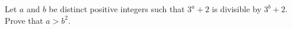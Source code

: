 \begin{problem}
    Let \( a \) and \( b \) be distinct positive integers such that \( 3^a + 2 \) is divisible by \( 3^b + 2 \).\\\indent Prove that \( a > b^2 \).
\end{problem}

